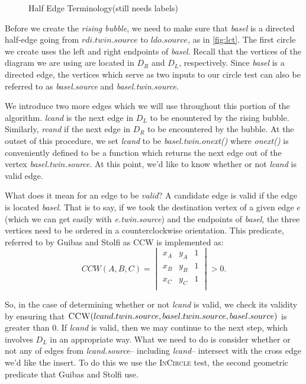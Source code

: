 \documentclass[12pt,twoside]{reedthesis}
\begin{document}
    \begin{figure}[!htb]
      \centering
      
      \caption{Half Edge Terminology(still needs labels)}
      \label{fig:half_edge}
    \end {figure}

  Before we create the \emph{rising bubble}, we need to make sure that \emph{basel} is a directed half-edge going from $rdi.twin.source$ to $ldo.source$, as in \cref{fig:lct}. The first circle we create uses the left and right endpoints of \emph{basel}. Recall that the vertices of the diagram we are using are located in $D_{R}$ and $D_{L}$, respectively. Since \emph{basel} is a directed edge, the vertices which serve as two inputs to our circle test can also be referred to as \emph{basel.source} and \emph{basel.twin.source}.\par

  We introduce two more edges which we will use throughout this portion of the algorithm. \emph{lcand} is the next edge in $D_{L}$ to be enountered by the rising bubble. Similarly, \emph{rcand} if the next edge in $D_{R}$ to be encountered by the bubble. At the outset of this procedure, we set \emph{lcand} to be \emph{basel.twin.onext()} where \emph{onext()} is conveniently defined to be a function which returns the next edge out of the vertex \emph{basel.twin.source}. At this point, we'd like to know whether or not \emph{lcand} is valid edge. \par 

  What does it mean for an edge to be \emph{valid}? A candidate edge is valid if the edge is located  \emph{basel}. That is to say, if we took the destination vertex of a given edge $e$ (which we can get easily with \emph{e.twin.source}) and the endpoints of \emph{basel}, the three vertices need to be ordered in a counterclockwise orientation. This predicate, referred to by Guibas and Stolfi as \textsc{CCW} is implemented as:
  $$
  CCW(A,B,C) =
  \begin{vmatrix}
  x_{A} & y_{A} & 1 \\
  x_{B} & y_{B} & 1 \\
  x_{C} & y_{C} & 1 \\  
  \end{vmatrix} > 0.
  $$  

  So, in the case of determining whether or not \emph{lcand} is valid, we check its validity by ensuring that $\textsc{CCW}(lcand.twin.source, basel.twin.source, basel.source)$ is greater than 0. If \emph{lcand} is valid, then we may continue to the next step, which involves  $D_{L}$ in an appropriate way. What we need to do is consider whether or not any of edges from \emph{lcand.source}-- including \emph{lcand}-- intersect with the cross edge we'd like the insert. To do this we use the \textsc{InCircle} test, the second geometric predicate that Guibas and Stolfi use. 
\end{document}
